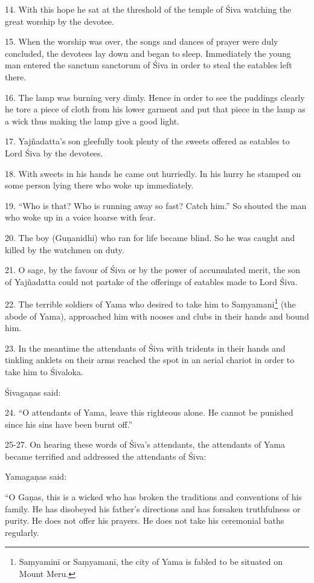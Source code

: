 14. With this hope he sat at the threshold of the temple of Śiva watching the
great worship by the devotee.

15. When the worship was over, the songs and dances of prayer were duly
concluded, the devotees lay down and began to sleep. Immediately the young man
entered the sanctum sanctorum of Śiva in order to steal the eatables left there.

16. The lamp was burning very dimly. Hence in order to see the puddings clearly
he tore a piece of cloth from his lower garment and put that piece in the lamp
as a wick thus making the lamp give a good light.

17. Yajñadatta’s son gleefully took plenty of the sweets offered as eatables to
Lord Śiva by the devotees.

18. With sweets in his hands he came out hurriedly. In his hurry he stamped on
some person lying there who woke up immediately.

19. “Who is that? Who is running away so fast? Catch him.” So shouted the man
who woke up in a voice hoarse with fear.

20. The  boy (Guṇanidhi) who ran for life became blind. So he was
caught and killed by the watchmen on duty.

21. O sage, by the favour of Śiva or by the power of accumulated merit, the son
of Yajñadatta could not partake of the offerings of eatables made to Lord Śiva.

22. The terrible soldiers of Yama who desired to take him to
Saṃyamani\footnote{Saṃyaminī or Saṃyamanī, the city of Yama is fabled to be
situated on Mount Meru.} (the abode of Yama), approached him with nooses and
clubs in their hands and bound him.

23. In the meantime the attendants of Śiva with tridents in their hands and
tinkling anklets on their arms reached the spot in an aerial chariot in order to
take him to Śivaloka.

Śivagaṇas said:

24. “O attendants of Yama, leave this righteous  alone. He cannot
be punished since his sins have been burnt off.”

25-27. On hearing these words of Śiva’s attendants, the attendants of Yama
became terrified and addressed the attendants of Śiva:

Yamagaṇas said:

“O Gaṇas, this is a wicked  who has broken the traditions and
conventions of his family. He has disobeyed his father’s directions and has
forsaken truthfulness or purity. He does not offer his  prayers. He
does not take his ceremonial baths regularly.

